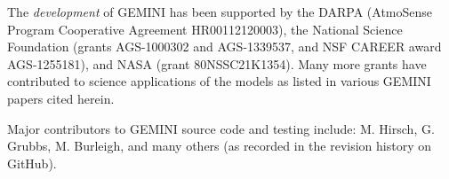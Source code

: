\documentclass[11pt,letterpaper]{article}
\begin{document}
The \emph{development} of GEMINI has been supported by the DARPA (AtmoSense Program Cooperative Agreement HR00112120003), the National Science Foundation (grants AGS-1000302 and AGS-1339537, and NSF CAREER award AGS-1255181), and NASA (grant 80NSSC21K1354).  Many more grants have contributed to science applications of the models as listed in various GEMINI papers cited herein.  

Major contributors to GEMINI source code and testing include:  M. Hirsch, G. Grubbs, M. Burleigh, and many others (as recorded in the revision history on GitHub).


\pagebreak
\setcounter{page}{1}


\end{document}
